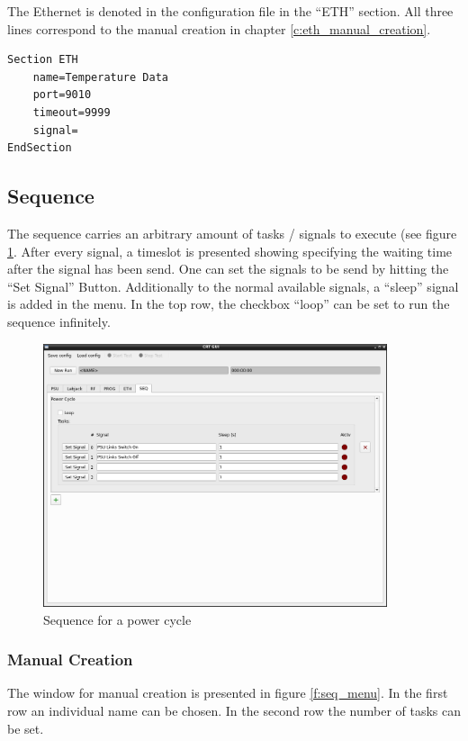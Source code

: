 \documentclass[10pt,a4paper]{article}
\begin{document}
	The Ethernet is denoted in the configuration file in the \enquote{ETH} section. All three lines correspond to the manual creation in chapter \ref{c:eth_manual_creation}. 
	
\begin{lstlisting}[caption=ETH Config]
Section ETH
	name=Temperature Data
	port=9010
	timeout=9999
	signal=
EndSection
\end{lstlisting}
	
	\newpage
	\subsection{Sequence}
	The sequence carries an arbitrary amount of tasks / signals to execute (see figure \ref{f:seq_example}. After every signal, a timeslot is presented showing specifying the waiting time after the signal has been send. One can set the signals to be send by hitting the \enquote{Set Signal} Button. Additionally to the normal available signals, a \enquote{sleep} signal is added in the menu. In the top row, the checkbox \enquote{loop} can be set to run the sequence infinitely.
	
	\begin{figure}[H]
\centering
\includegraphics[width=0.9\textwidth]{./9_SEQ_example.png}
\caption{Sequence for a power cycle}
\label{f:seq_example}
	\end{figure}	 
	
	\subsubsection{Manual Creation}	
	\label{c:seq_manual_creation}
	
	The window for manual creation is presented in figure \eqref{f:seq_menu}. In the first row an individual name can be chosen. In the second row the number of tasks can be set.
	
\end{document}
